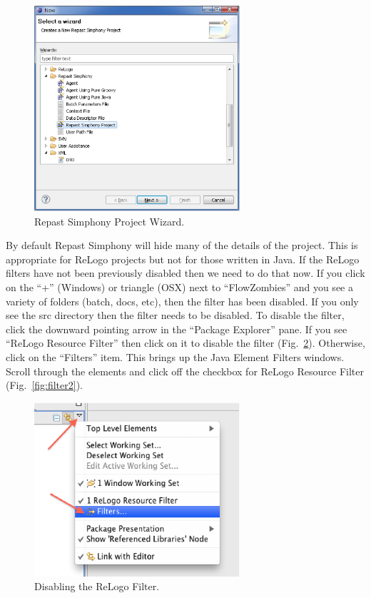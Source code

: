 \documentclass[11pt]{amsart}
\begin{document}
\begin{figure}[h]
\begin{center}
\vspace{.2in}
\centerline {
\includegraphics[width=3in]{figs/new_wizard.eps}
}
\caption{Repast Simphony Project Wizard.}
\label{fig:newprojecticon}
\end{center}
\end{figure}

By default Repast Simphony will hide many of the details of the project. This is appropriate for ReLogo projects but not for those written in Java. If the ReLogo filters have not been previously disabled then we need to do that now. If you click on the ``+'' (Windows) or triangle (OSX) next to ``FlowZombies'' and you see a variety of folders (batch, docs, etc), then the filter has been disabled. If you only see the src directory then the filter needs to be disabled. To disable the filter, click the downward pointing arrow in the ``Package Explorer'' pane. If you see ``ReLogo Resource Filter''  then click on it to disable the filter (Fig.~\ref{fig:filter}).  Otherwise, click on the ``Filters'' item. This brings up the Java Element Filters windows. Scroll through the elements and click off the checkbox for ReLogo Resource Filter (Fig.~\ref{fig:filter2}). 

\begin{figure}[h]
\begin{center}
\vspace{.2in}
\centerline {
\includegraphics[width=3in]{figs/filter.eps}
}
\caption{Disabling the ReLogo Filter.}
\label{fig:filter}
\end{center}
\end{figure}
\end{document}
